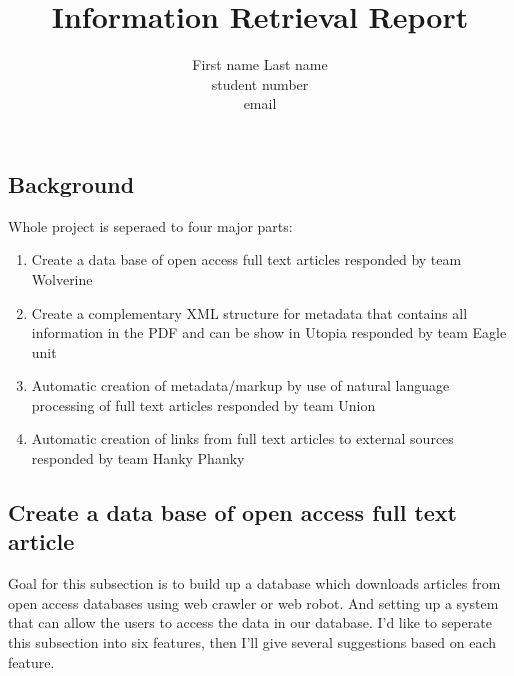 \documentclass[a4paper]{article} %
\begin{document}
	
	\title{Information Retrieval Report}
	\author{First name Last name \\ student number \\ email} 
	
	\maketitle                     %
	
	
	
	
	
	\subsection*{Background}
	\label{background}
	
	Whole project is seperaed to four major parts:
	\begin{enumerate}
		\item Create a data base of open access full text articles responded by team Wolverine
		\item Create a complementary XML structure for metadata that contains all information in the PDF and can be show in Utopia responded by team Eagle unit
		\item Automatic creation of metadata/markup by use of natural language processing of full text articles responded by team Union
		\item Automatic creation of links from full text articles to external sources responded by team Hanky Phanky
	\end{enumerate}
	
	\clearpage
	
	\subsection*{Create a data base of open access full text article}
	\label{task1}
	
	Goal for this subsection is to build up a database which downloads articles from open access databases using web crawler or web robot. And setting up a system that can allow the users to access the data in our database. I'd like to seperate this subsection into six features, then I'll give several suggestions based on each feature. 
	
\end{document}
